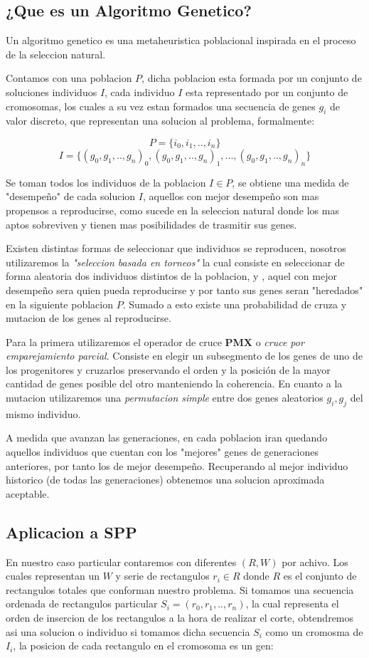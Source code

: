 \documentclass[10pt]{article}
\begin{document}
\subsection{¿Que es un Algoritmo Genetico?}

Un algoritmo genetico es una metaheuristica poblacional inspirada en el proceso de la seleccion natural.

Contamos con una poblacion $P$, dicha poblacion esta formada por un conjunto de soluciones individuos $I$, cada individuo $I$ esta representado por un conjunto de cromosomas, los cuales a su vez estan formados una secuencia de genes $g_i$ de valor discreto, que representan una solucion al problema, formalmente:

$$P =\{i_0,i_1,..,i_n\}$$
$$I =\{(g_0,g_1,..,g_n)_0,(g_0,g_1,..,g_n)_1,...,(g_0,g_1,..,g_n)_n\}$$

Se toman todos los individuos de la poblacion $I \in P$, se obtiene una medida de "desempeño" de cada solucion $I$, aquellos con mejor desempeño son mas propensos a reproducirse, como sucede en la seleccion natural donde los mas aptos sobreviven y tienen mas posibilidades de trasmitir sus genes.

Existen distintas formas de seleccionar que individuos se reproducen, nosotros utilizaremos la \textit{"seleccion basada en torneos"} la cual consiste en seleccionar de forma aleatoria dos individuos distintos de la poblacion, y , aquel con mejor desempeño sera quien pueda reproducirse y por tanto sus genes seran "heredados" en la siguiente poblacion $P$. Sumado a esto existe una probabilidad de cruza y mutacion de los genes al reproducirse.

Para la primera utilizaremos el operador de cruce \textbf{PMX} o \textit{cruce por emparejamiento parcial}. Consiste en elegir un subsegmento de los genes de uno de los progenitores y cruzarlos preservando el orden y la posición de la mayor cantidad de genes posible del otro manteniendo la coherencia.
En cuanto a la mutacion utilizaremos una \textit{permutacion simple} entre dos genes aleatorios $g_i,g_j$ del mismo individuo.

A medida que avanzan las generaciones, en cada poblacion iran quedando aquellos individuos que cuentan con los "mejores"  genes de generaciones anteriores, por tanto los de mejor desempeño. Recuperando al mejor individuo historico (de todas las generaciones) obtenemos una solucion aproximada aceptable.

\subsection{Aplicacion a SPP}
En nuestro caso particular contaremos con diferentes $(R,W)$ por achivo. Los cuales representan un $W$ y serie de rectangulos $r_i \in R$ donde $R$ es el conjunto de rectangulos totales que conforman nuestro problema. Si tomamos una secuencia ordenada de rectangulos particular $S_i = (r_0,r_1,..,r_n)$, la cual representa el orden de insercion de los rectangulos a la hora de realizar el corte, obtendremos asi una solucion o individuo si tomamos dicha secuencia $S_i$ como un cromosma de $I_i$, la posicion de cada rectangulo en el cromosoma es un gen:
\end{document}
